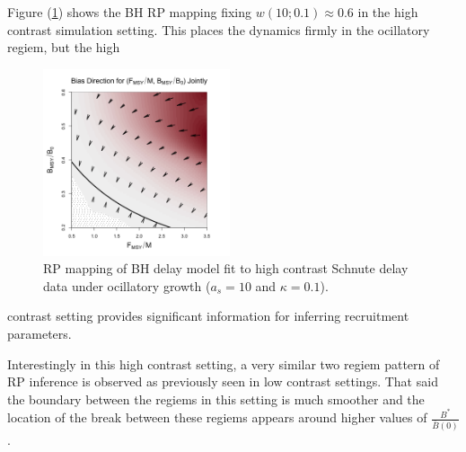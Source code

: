 %
Figure (\ref{ocillationArrow}) shows the BH RP mapping fixing $w(10;0.1)\approx0.6$ 
in the high contrast simulation setting. This places the dynamics firmly in the 
ocillatory regiem, but the 
high %
%
\begin{figure}
\vspace{-0.75cm}
\includegraphics[width=0.49\textwidth]{../ddBias/directionalBiasDDSubExpT45N300A0-1AS10K0.1.png}
\vspace{-0.95cm}
\caption{RP mapping of BH delay model fit to high contrast Schnute delay data under ocillatory growth ($a_s=10$ and $\kappa=0.1$).
}\label{ocillationArrow}
\end{figure}
contrast setting provides significant information for inferring recruitment parameters.  

%
Interestingly in this high contrast setting, a very similar two regiem pattern 
of RP inference is observed as previously seen in low contrast settings. 
That said the boundary between the regiems in this setting is much smoother 
and the location of the break between these regiems appears around higher values of 
$\frac{B^*}{\bar B(0)}$. %

